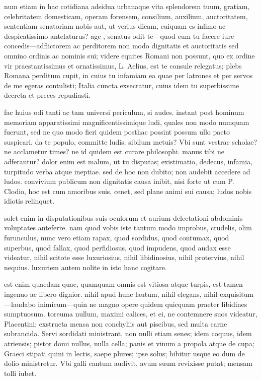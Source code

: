  num etiam in hac cotidiana adsidua urbanaque vita splendorem tuum, gratiam, celebritatem domesticam, operam forensem, consilium, auxilium, auctoritatem, sententiam senatoriam nobis aut, ut verius dicam, cuiquam es infimo ac despicatissimo antelaturus? age , senatus odit te—quod eum tu facere iure concedis—adflictorem ac perditorem non modo dignitatis et auctoritatis sed omnino ordinis ac nominis sui; videre equites Romani non possunt, quo ex ordine vir praestantissimus et ornatissimus, L. Aelius, est te consule relegatus; plebs Romana perditum cupit, in cuius tu infamiam ea quae per latrones et per servos de me egeras contulisti; Italia cuncta exsecratur, cuius idem tu superbissime decreta et preces repudiasti.

 fac huius odi tanti ac tam universi periculum, si audes. instant post hominum memoriam apparatissimi magnificentissimique ludi, quales non modo numquam fuerunt, sed ne quo modo fieri quidem posthac possint possum ullo pacto suspicari. da te populo, committe ludis. sibilum metuis? Vbi sunt vestrae scholae? ne acclametur times? ne id quidem est curare philosophi. manus tibi ne adferantur? dolor enim est malum, ut tu disputas; existimatio, dedecus, infamia, turpitudo verba atque ineptiae. sed de hoc non dubito; non audebit accedere ad ludos. convivium publicum non dignitatis causa inibit, nisi forte ut cum P. Clodio, hoc est cum amoribus suis, cenet, sed plane animi sui causa; ludos nobis idiotis relinquet.

 solet enim in disputationibus suis oculorum et aurium delectationi abdominis voluptates anteferre. nam quod vobis iste tantum modo improbus, crudelis, olim furunculus, nunc vero etiam rapax, quod sordidus, quod contumax, quod superbus, quod fallax, quod perfidiosus, quod impudens, quod audax esse videatur, nihil scitote esse luxuriosius, nihil libidinosius, nihil protervius, nihil nequius. luxuriem autem nolite in isto hanc cogitare.

 est enim quaedam quae, quamquam omnis est vitiosa atque turpis, est tamen ingenuo ac libero dignior. nihil apud hunc lautum, nihil elegans, nihil exquisitum—laudabo inimicum—quin ne magno opere quidem quicquam praeter libidines sumptuosum. toreuma nullum, maximi calices, et ei, ne contemnere suos videatur, Placentini; exstructa mensa non conchyliis aut piscibus, sed multa carne subrancida. Servi sordidati ministrant, non nulli etiam senes; idem coquus, idem atriensis; pistor domi nullus, nulla cella; panis et vinum a propola atque de cupa; Graeci stipati quini in lectis, saepe plures; ipse solus; bibitur usque eo dum de dolio ministretur. Vbi galli cantum audivit, avum suum revixisse putat; mensam tolli iubet.


